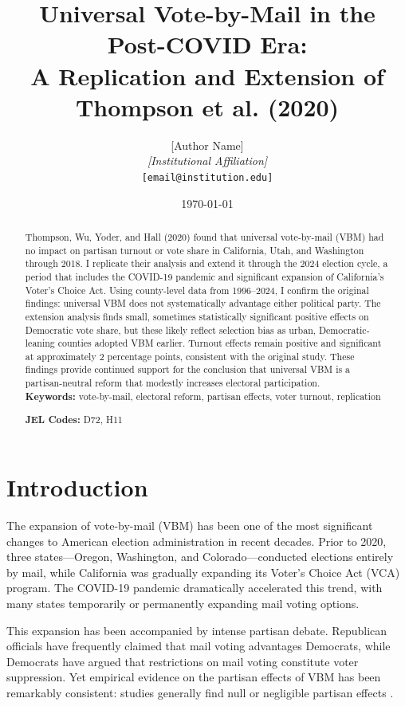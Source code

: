 \documentclass[12pt]{article}
\title{Universal Vote-by-Mail in the Post-COVID Era: \\
A Replication and Extension of Thompson et al. (2020)}
\author{[Author Name] \\
\textit{[Institutional Affiliation]} \\
\texttt{[email@institution.edu]}}
\date{\today}
\begin{document}
\maketitle

\begin{abstract}
\noindent Thompson, Wu, Yoder, and Hall (2020) found that universal vote-by-mail (VBM) had no impact on partisan turnout or vote share in California, Utah, and Washington through 2018. I replicate their analysis and extend it through the 2024 election cycle, a period that includes the COVID-19 pandemic and significant expansion of California's Voter's Choice Act. Using county-level data from 1996--2024, I confirm the original findings: universal VBM does not systematically advantage either political party. The extension analysis finds small, sometimes statistically significant positive effects on Democratic vote share, but these likely reflect selection bias as urban, Democratic-leaning counties adopted VBM earlier. Turnout effects remain positive and significant at approximately 2 percentage points, consistent with the original study. These findings provide continued support for the conclusion that universal VBM is a partisan-neutral reform that modestly increases electoral participation. \\

\noindent \textbf{Keywords:} vote-by-mail, electoral reform, partisan effects, voter turnout, replication

\noindent \textbf{JEL Codes:} D72, H11
\end{abstract}

\newpage

\section{Introduction}

The expansion of vote-by-mail (VBM) has been one of the most significant changes to American election administration in recent decades. Prior to 2020, three states---Oregon, Washington, and Colorado---conducted elections entirely by mail, while California was gradually expanding its Voter's Choice Act (VCA) program. The COVID-19 pandemic dramatically accelerated this trend, with many states temporarily or permanently expanding mail voting options.

This expansion has been accompanied by intense partisan debate. Republican officials have frequently claimed that mail voting advantages Democrats, while Democrats have argued that restrictions on mail voting constitute voter suppression. Yet empirical evidence on the partisan effects of VBM has been remarkably consistent: studies generally find null or negligible partisan effects \citep{thompson2020universal, barber2022voting, yoder2021does}.
\end{document}

